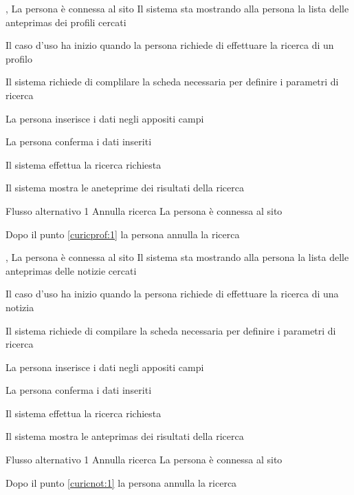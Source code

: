 
{, }
{La persona è connessa al sito}
{Il sistema sta mostrando alla persona la lista delle \glspl{anteprima} dei profili cercati}
{\begin{enumCU}
	\item Il caso d'uso ha inizio quando la persona richiede di effettuare la ricerca di un profilo
	\item Il sistema richiede di complilare la scheda necessaria per definire i parametri di ricerca
	\item La persona inserisce i dati negli appositi campi \label{curicprof:1}
	\item La persona conferma i dati inseriti
	\item Il sistema effettua la ricerca richiesta
	\item Il sistema mostra le aneteprime dei risultati della ricerca
\end{enumCU}
}
%
{Flusso alternativo 1}%
{Annulla ricerca}%
{La persona è connessa al sito}%
{\postNulle}%
{\begin{enumCU}
		\item Dopo il punto \ref{curicprof:1} la persona annulla la ricerca
	\end{enumCU}}%



{, }
{La persona è connessa al sito}
{Il sistema sta mostrando alla persona la lista delle \glspl{anteprima} delle notizie cercati}
{\begin{enumCU}
	\item Il caso d'uso ha inizio quando la persona richiede di effettuare la ricerca di una notizia
	\item Il sistema richiede di compilare la scheda necessaria per definire i parametri di ricerca
	\item La persona inserisce i dati negli appositi campi \label{curicnot:1}
	\item La persona conferma i dati inseriti
	\item Il sistema effettua la ricerca richiesta
	\item Il sistema mostra le \glspl{anteprima} dei risultati della ricerca
\end{enumCU}
}
%
{Flusso alternativo 1}%
{Annulla ricerca}%
{La persona è connessa al sito}%
{\postNulle}%
{\begin{enumCU}
		\item Dopo il punto \ref{curicnot:1} la persona annulla la ricerca
	\end{enumCU}}%


